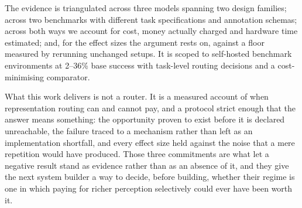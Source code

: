 The evidence is triangulated across three models spanning two design families;
across two benchmarks with different task specifications and annotation
schemas; across both ways we account for cost, money actually
charged and hardware time estimated; and, for the effect sizes the argument
rests on, against a floor measured by rerunning unchanged setups. It is scoped to self-hosted benchmark
environments at 2--36\% base success with task-level routing decisions and a
cost-minimising comparator.

What this work delivers is not a router. It is a measured account of when
representation routing can and cannot pay, and a protocol strict enough that the
answer means something: the opportunity proven to exist before it is declared
unreachable, the failure traced to a mechanism rather than left as an implementation shortfall, and every effect size held against the noise that a
mere repetition would have produced. Those three commitments are what let a
negative result stand as evidence rather than as an absence of it, and they give the next system builder a way to decide, before building, whether their
regime is one in which paying for richer perception selectively could ever have
been worth it.
